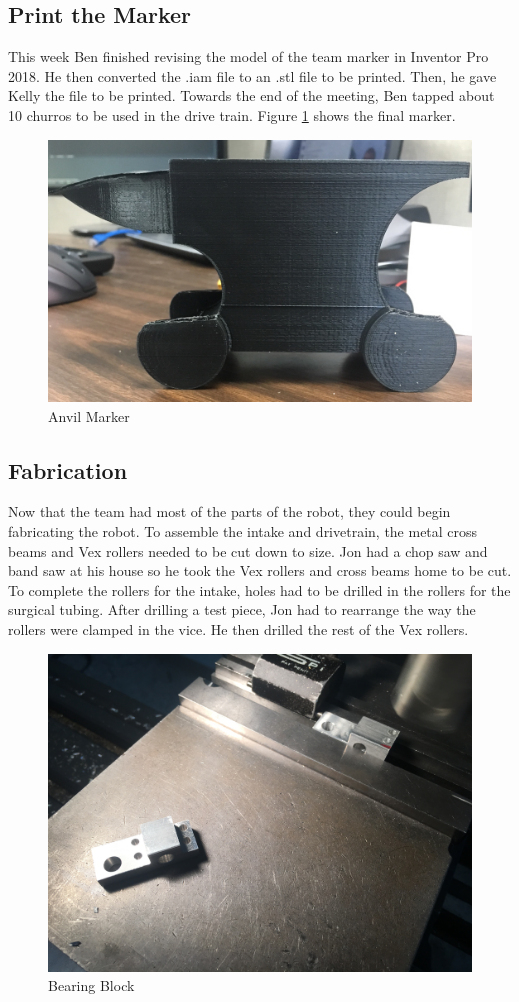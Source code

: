\documentclass{article}
\newif\ifcontents
\begin{document}
\contentsfalse

\subsection{Print the Marker}
This week Ben finished revising the model of the team marker in Inventor Pro 2018. He then converted the .iam file to an .stl file to be printed. Then, he gave Kelly the file to be printed. Towards the end of the meeting, Ben tapped about 10 churros to be used in the drive train. Figure \ref{fig:marker} shows the final marker. 

\begin{figure}
    \centering
    \includegraphics[width=.6 \textwidth]{09_10-29/images/anvil_marker.jpg}
    \caption{Anvil Marker}
    \label{fig:marker}
\end{figure}

\subsection{Fabrication}
Now that the team had most of the parts of the robot, they could begin fabricating the robot. To assemble the intake and drivetrain, the metal cross beams and Vex rollers needed to be cut down to size. Jon had a chop saw and band saw at his house so he took the Vex rollers and cross beams home to be cut. To complete the rollers for the intake, holes had to be drilled in the rollers for the surgical tubing. After drilling a test piece, Jon had to rearrange the way the rollers were clamped in the vice. He then drilled the rest of the Vex rollers.

\begin{figure}
    \centering
    \includegraphics[width=.6 \textwidth]{09_10-29/images/bearingblock.JPG}
    \caption{Bearing Block}
    \label{fig:bearingblock}
\end{figure}
\end{document}
